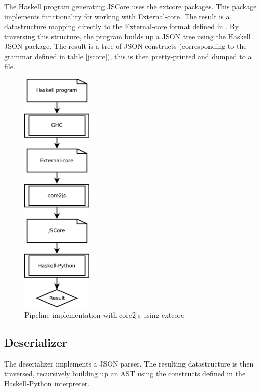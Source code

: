 The Haskell program generating JSCore uses the extcore packages. This package
implements functionality for working with External-core. The result is a datastructure
mapping directly to the External-core format defined in \cite{tolmach2010ghc}. By traversing
this structure, the program builds up a JSON tree using the Haskell JSON package.
The result is a tree of JSON constructs (corresponding to the grammar defined 
in table \ref{jscore}), this is then pretty-printed and dumped to a file.

\begin{figure}[H]
\begin{center}
\includegraphics[width=0.3\textwidth]{diags/pipe_w_core2js}
\caption[Pipeline with core2js]{Pipeline implementation with core2js using extcore}
\label{core2js}
\end{center}
\end{figure}

\subsection{Deserializer}

The deserializer implements a JSON parser. The resulting datastructure is then 
traversed, recursively building up an AST using the constructs defined in the 
Haskell-Python interpreter. 

